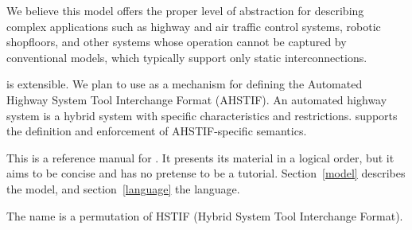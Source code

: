 We believe this model offers the proper level of abstraction for
describing complex applications such as highway and air traffic
control systems, robotic shopfloors, and other systems whose operation
cannot be captured by conventional models, which typically support
only static interconnections.

\todaysname{} is extensible.  We plan to use \todaysname{} as a
mechanism for defining the Automated Highway System Tool Interchange
Format (AHSTIF).  An automated highway system is a hybrid system with
specific characteristics and restrictions. \todaysname{} supports the
definition and enforcement of AHSTIF-specific semantics.

This is a reference manual for \todaysname.  It presents its material
in a logical order, but it aims to be concise and has no pretense to
be a \todaysname{} tutorial.  Section~\ref{model} describes the model,
and section~\ref{language} the language.

The name \todaysname{} is a permutation of HSTIF (Hybrid System Tool
Interchange Format).

